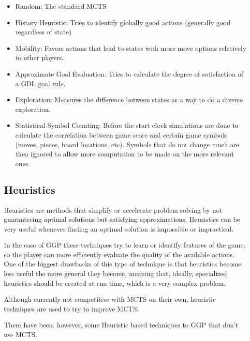 \begin{itemize}

\item Random: The standard MCTS

\item History Heuristic: Tries to identify globally good actions (generally good regardless of state)

\item Mobility: Favors actions that lead to states with more move options relatively to other players.

\item Approximate Goal Evaluation: Tries to calculate the degree of satisfaction of a GDL goal rule.

\item Exploration: Measures the difference between states as a way to do a diverse exploration.

\item Statistical Symbol Counting: Before the start clock simulations are done to calculate the correlation between game score and certain game symbols (moves, pieces, board locations, etc). Symbols that do not change much are then ignored to allow more computation to be made on the more relevant ones.

\end{itemize}

\subsection{Heuristics}
Heuristics are methods that simplify or accelerate problem solving by not guaranteeing optimal solutions but satisfying approximations. Heuristics can be very useful whenever finding an optimal solution is impossible or impractical.

In the case of \gls{GGP} these techniques try to learn or identify features of the game, so the player can more efficiently evaluate the quality of the available actions. One of the biggest drawbacks of this type of technique is that heuristics become less useful the more general they become, meaning that, ideally, specialized heuristics should be created at run time, which is a very complex problem.

Although currently not competitive with \gls{MCTS} on their own, heuristic techniques are used to try to improve \gls{MCTS}.

There have been, however, some Heuristic based techniques to \gls{GGP} that don't use \gls{MCTS}.

